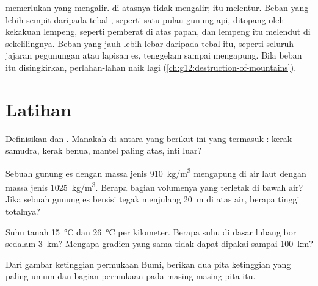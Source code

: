  memerlukan  yang mengalir.  di atasnya tidak
mengalir;  itu melentur. Beban yang lebih sempit daripada tebal
, seperti satu pulau gunung api, ditopang oleh kekakuan lempeng, seperti
pemberat di atas papan, dan lempeng itu melendut di sekelilingnya. Beban yang
jauh lebih lebar daripada tebal itu, seperti seluruh jajaran pegunungan atau
lapisan es, tenggelam sampai mengapung. Bila beban itu disingkirkan, 
perlahan-lahan naik lagi (\cref{ch:g12:destruction-of-mountains}).

\section{Latihan}

\begin{exercise}[$\star$]\label{exo:g11:lithosphere-asthenosphere:1}
Definisikan  dan . Manakah di antara yang berikut ini yang
termasuk : kerak samudra, kerak benua, mantel paling atas, inti luar?
\end{exercise}

\begin{exercise}[$\star$]\label{exo:g11:lithosphere-asthenosphere:2}
Sebuah gunung es dengan massa jenis \qty{910}{kg/m^3} mengapung di air laut
dengan massa jenis \qty{1025}{kg/m^3}. Berapa bagian volumenya yang terletak di
bawah air? Jika sebuah gunung es bersisi tegak menjulang \qty{20}{m} di atas air,
berapa tinggi totalnya?
\end{exercise}

\begin{exercise}[$\star$]\label{exo:g11:lithosphere-asthenosphere:3}
Suhu tanah \qty{15}{\celsius} dan 
\qty{26}{\celsius} per kilometer. Berapa suhu di dasar lubang bor sedalam
\qty{3}{km}? Mengapa gradien yang sama tidak dapat dipakai sampai
\qty{100}{km}?
\end{exercise}

\begin{exercise}[$\star$]\label{exo:g11:lithosphere-asthenosphere:4}
Dari gambar ketinggian permukaan Bumi, berikan dua pita ketinggian yang paling
umum dan bagian permukaan pada masing-masing pita itu.
\end{exercise}

